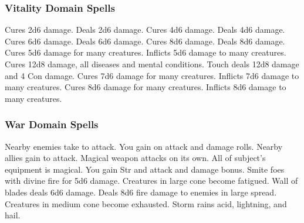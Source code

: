 \subsubsection{Vitality Domain Spells}

\begin{spelllist}
     Cures 2d6 damage.
     Deals 2d6 damage.
     Cures 4d6 damage.
     Deals 4d6 damage.
     Cures 6d6 damage.
     Deals 6d6 damage.
     Cures 8d6 damage.
     Deals 8d6 damage.
     Cures 5d6 damage for many creatures.
     Inflicts 5d6 damage to many creatures.
     Cures 12d8 damage, all diseases and mental conditions.
     Touch deals 12d8 damage and 4 Con damage.
     Cures 7d6 damage for many creatures.
     Inflicts 7d6 damage to many creatures.
     Cures 8d6 damage for many creatures.
     Inflicts 8d6 damage to many creatures.
    \spellhead[9]{}
    \spellhead[9]{}
\end{spelllist}

\subsubsection{War Domain Spells}

\begin{spelllist}
     Nearby enemies take  to attack.
     You gain  on attack and damage rolls.
     Nearby allies gain  to attack.
     Magical weapon attacks on its own.
    \spellhead[3]{}
    \spellhead[3]{}
     All of subject's equipment is magical.
     You gain  Str and attack and damage bonus.
     Smite foes with divine fire for 5d6 damage.
     Creatures in large cone become fatigued.
     Wall of blades deals 6d6 damage.
    \spellhead[6]{}
    \spellhead[7]{}
    \spellhead[7]{}
     Deals 8d6 fire damage to enemies in large spread.
     Creatures in medium cone become exhausted.  
    \spellhead[9]{}
     Storm rains acid, lightning, and hail.
\end{spelllist}


